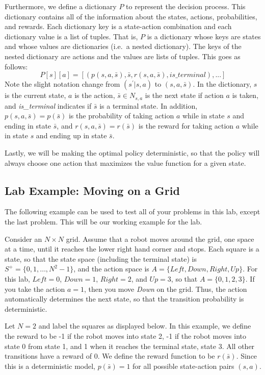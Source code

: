 Furthermore, we define a dictionary $P$ to represent the decision process.
This dictionary contains all of the information about the states, actions, probabilities, and rewards.
Each dictionary key is a state-action combination and each dictionary value is a list of tuples.
That is, $P$ is a dictionary whose keys are states and whose values are dictionaries (i.e.\ a nested dictionary).
The keys of the nested dictionary are actions and the values are lists of tuples.
This goes as follows:
\[P[s][a]=[(p(s,a,\bar{s}), \bar{s}, r(s,a,\bar{s}), is\_terminal),...]\]
Note the slight notation change from $(s^\prime|s,a)$ to $(s,a,\bar{s})$.
In the dictionary, $s$ is the current state, $a$ is the action, $\bar{s}\in N_{s,a}$ is the next state if action $a$ is taken, and \emph{is\_terminal} indicates if $\bar{s}$ is a terminal state.
In addition, $p(s,a,\bar{s})=p(\bar{s})$ is the probability of taking action $a$ while in state $s$ and ending in state $\bar{s}$, and $r(s,a,\bar{s})=r(\bar{s})$ is the reward for taking action $a$ while in state $s$ and ending up in state $\bar{s}$.

Lastly, we will be making the optimal policy deterministic, so that the policy will always choose one action that maximizes the value function for a given state.

\subsection*{Lab Example: Moving on a Grid}
The following example can be used to test all of your problems in this lab, except the last problem.
This will be our working example for the lab.

Consider an $N \times N$ grid.
Assume that a robot moves around the grid, one space at a time, until it reaches the lower right hand corner and stops.
Each square is a state, so that the state space (including the terminal state) is $S^+ = \{0, 1, \ldots, N^2-1\}$, and the action space is $A=\{Left, Down, Right, Up\}$.
For this lab, $Left = 0$, $Down = 1$, $Right = 2$, and $Up = 3$, so that $A=\{0,1,2,3\}$.
If you take the action $a = 1$, then you move \emph{Down} on the grid.
Thus, the action automatically determines the next state, so that the transition probability is deterministic.

Let $N=2$ and label the squares as displayed below.
In this example, we define the reward to be -1 if the robot moves into state 2, -1 if the robot moves into state 0 from state 1, and 1 when it reaches the terminal state, state 3.
All other transitions have a reward of 0.
We define the reward function to be $r(\bar{s})$.
Since this is a deterministic model, $p(\bar{s}) = 1$ for all possible state-action pairs $(s,a)$.

